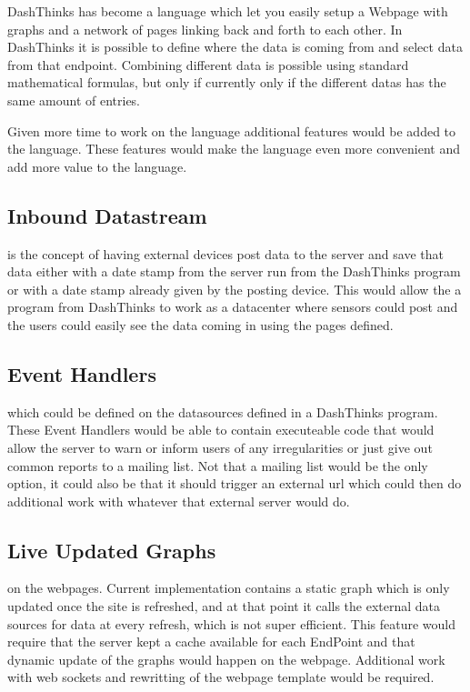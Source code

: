 DashThinks has become a language which let you easily setup a Webpage with graphs and a network
of pages linking back and forth to each other.
In DashThinks it is possible to define where the data is coming from and select data from that
endpoint. Combining different data is possible using standard mathematical formulas,
but only if currently only if the different datas has the same amount of entries.

Given more time to work on the language additional features would be added to the language.
These features would make the language even more convenient and add more value to the language.

\subsection{Inbound Datastream} is the concept of having external devices post data to the
server and save that data either with a date stamp from the server run from the DashThinks
program or with a date stamp already given by the posting device. This would allow the a program
from DashThinks to work as a datacenter where sensors could post and the users could easily see
the data coming in using the pages defined.

\subsection{Event Handlers} which could be defined on the datasources defined in a DashThinks
program. These Event Handlers would be able to contain executeable code that would allow the
server to warn or inform users of any irregularities or just give out common reports to
a mailing list. Not that a mailing list would be the only option, it could also be that it
should trigger an external url which could then do additional work with whatever that external
server would do.

\subsection{Live Updated Graphs} on the webpages. Current implementation contains a static
graph which is only updated once the site is refreshed, and at that point it calls the
external data sources for data at every refresh, which is not super efficient. This feature
would require that the server kept a cache available for each EndPoint and that dynamic
update of the graphs would happen on the webpage. Additional work with web sockets and
rewritting of the webpage template would be required. 

